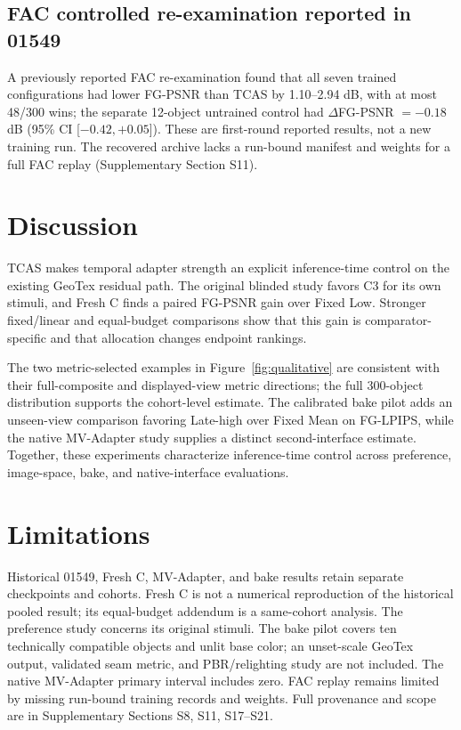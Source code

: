 \documentclass[times,twocolumn,final]{elsarticle}
\begin{document}
\subsection{FAC controlled re-examination reported in 01549}
\label{subsec:facreported}

A previously reported FAC re-examination found that all seven trained configurations had lower FG-PSNR than TCAS by 1.10--2.94 dB, with at most 48/300 wins; the separate 12-object untrained control had $\Delta$FG-PSNR $=-0.18$ dB (95\% CI [$-0.42,+0.05$]). These are first-round reported results, not a new training run. The recovered archive lacks a run-bound manifest and weights for a full FAC replay (Supplementary Section S11).

\section{Discussion}
TCAS makes temporal adapter strength an explicit inference-time control on the existing GeoTex residual path. The original blinded study favors C3 for its own stimuli, and Fresh C finds a paired FG-PSNR gain over Fixed Low. Stronger fixed/linear and equal-budget comparisons show that this gain is comparator-specific and that allocation changes endpoint rankings.

The two metric-selected examples in Figure~\ref{fig:qualitative} are consistent with their full-composite and displayed-view metric directions; the full 300-object distribution supports the cohort-level estimate. The calibrated bake pilot adds an unseen-view comparison favoring Late-high over Fixed Mean on FG-LPIPS, while the native MV-Adapter study supplies a distinct second-interface estimate. Together, these experiments characterize inference-time control across preference, image-space, bake, and native-interface evaluations.

\section{Limitations}
\label{sec:limitations}
Historical 01549, Fresh C, MV-Adapter, and bake results retain separate checkpoints and cohorts. Fresh C is not a numerical reproduction of the historical pooled result; its equal-budget addendum is a same-cohort analysis. The preference study concerns its original stimuli. The bake pilot covers ten technically compatible objects and unlit base color; an unset-scale GeoTex output, validated seam metric, and PBR/relighting study are not included. The native MV-Adapter primary interval includes zero. FAC replay remains limited by missing run-bound training records and weights. Full provenance and scope are in Supplementary Sections S8, S11, S17--S21.
\end{document}

